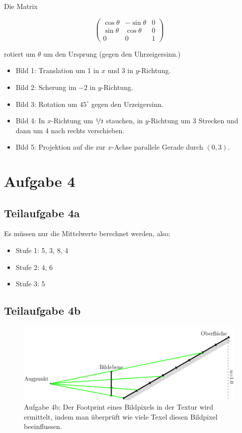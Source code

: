 \documentclass[a4paper]{scrartcl}
\begin{document}
Die Matrix

\[\begin{pmatrix}\cos \theta & -\sin \theta & 0\\\sin \theta & \cos \theta & 0\\0 & 0 & 1\end{pmatrix}\]

rotiert um $\theta$ um den Ursprung (gegen den Uhrzeigersinn.)

\begin{itemize}
    \item Bild 1: Translation um 1 in $x$ und 3 in $y$-Richtung.
    \item Bild 2: Scherung im $-2$ in $y$-Richtung.
    \item Bild 3: Rotation um $45^\circ$ gegen den Urzeigersinn.
    \item Bild 4: In $x$-Richtung um $\nicefrac{1}{2}$ stauchen, in $y$-Richtung
                  um 3 Strecken und dann um 4 nach rechts verschieben.
    \item Bild 5: Projektion auf die zur $x$-Achse parallele Gerade durch $(0, 3)$.
\end{itemize}


\section*{Aufgabe 4}
\subsection*{Teilaufgabe 4a}

Es müssen nur die Mittelwerte berechnet werden, also:

\begin{itemize}
    \item Stufe 1: 5, 3, 8, 4
    \item Stufe 2: 4, 6
    \item Stufe 3: 5
\end{itemize}

\subsection*{Teilaufgabe 4b}
\begin{figure}[h]
    \centering
    \includegraphics*[width=0.8\linewidth, keepaspectratio]{4b.png}
    \caption{Aufgabe 4b; Der Footprint eines Bildpixels in der Textur wird
             ermittelt, indem man überprüft wie viele Texel diesen Bildpixel
             beeinflussen.}
    \label{fig:4b}
\end{figure}
\end{document}
